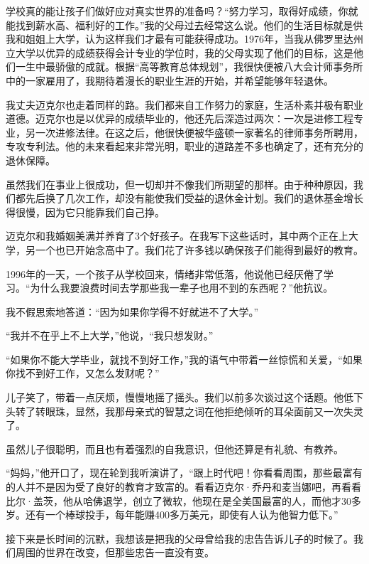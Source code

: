 
学校真的能让孩子们做好应对真实世界的准备吗？“努力学习，取得好成绩，你就能找到薪水高、福利好的工作。”我的父母过去经常这么说。他们的生活目标就是供我和姐姐上大学，认为这样我们才最有可能获得成功。1976年，当我从佛罗里达州立大学以优异的成绩获得会计专业的学位时，我的父母实现了他们的目标，这是他们一生中最骄傲的成就。根据“高等教育总体规划”，我很快便被八大会计师事务所中的一家雇用了，我期待着漫长的职业生涯的开始，并希望能够年轻退休。

我丈夫迈克尔也走着同样的路。我们都来自工作努力的家庭，生活朴素并极有职业道德。迈克尔也是以优异的成绩毕业的，他还先后深造过两次：一次是进修工程专业，另一次进修法律。在这之后，他很快便被华盛顿一家著名的律师事务所聘用，专攻专利法。他的未来看起来非常光明，职业的道路差不多也确定了，还有充分的退休保障。

虽然我们在事业上很成功，但一切却并不像我们所期望的那样。由于种种原因，我们都先后换了几次工作，却没有能使我们受益的退休金计划。我们的退休基金增长得很慢，因为它只能靠我们自己挣。

迈克尔和我婚姻美满并养育了3个好孩子。在我写下这些话时，其中两个正在上大学，另一个也已开始念高中了。我们花了许多钱以确保孩子们能得到最好的教育。

1996年的一天，一个孩子从学校回来，情绪非常低落，他说他已经厌倦了学习。“为什么我要浪费时间去学那些我一辈子也用不到的东西呢？”他抗议。

我不假思索地答道：“因为如果你学得不好就进不了大学。”

“我并不在乎上不上大学，”他说，“我只想发财。”

“如果你不能大学毕业，就找不到好工作，”我的语气中带着一丝惊慌和关爱，“如果你找不到好工作，又怎么发财呢？”

儿子笑了，带着一点厌烦，慢慢地摇了摇头。我们以前多次谈过这个话题。他低下头转了转眼珠，显然，我那母亲式的智慧之词在他拒绝倾听的耳朵面前又一次失灵了。

虽然儿子很聪明，而且也有着强烈的自我意识，但他还算是有礼貌、有教养。

“妈妈，”他开口了，现在轮到我听演讲了，“跟上时代吧！你看看周围，那些最富有的人并不是因为受了良好的教育才致富的。看看迈克尔·乔丹和麦当娜吧，再看看比尔·盖茨，他从哈佛退学，创立了微软，他现在是全美国最富的人，而他才30多岁。还有一个棒球投手，每年能赚400多万美元，即使有人认为他智力低下。”

接下来是长时间的沉默，我想该是把我的父母曾给我的忠告告诉儿子的时候了。我们周围的世界在改变，但那些忠告一直没有变。

